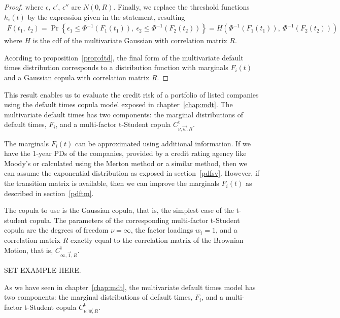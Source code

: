 \documentclass[11pt,fleqn]{book} %
\begin{document}
\begin{proof}
	where $\epsilon$, $\epsilon'$, $\epsilon''$ are $N(0,R)$. 
	Finally, we replace the threshold functions $h_i(t)$ by the expression 
	given in the statement, resulting
	\begin{displaymath}
		\begin{array}{l}
			F(t_1,\ t_2) = 
			\Pr\left\{ \epsilon_1 \le \Phi^{-1}(F_1(t_1)),\ \epsilon_2 \le \Phi^{-1}(F_2(t_2)) \right\} = 
			H\left( \Phi^{-1}(F_1(t_1)),\ \Phi^{-1}(F_2(t_2)) \right)
		\end{array}
	\end{displaymath}
	where $H$ is the cdf of the multivariate Gaussian with correlation matrix $R$.
	
	Acording to proposition~\ref{prop:dtd}, the final form of the multivariate
	default times distribution corresponds to a distribution function with 
	marginals $F_i(t)$ and a Gaussian copula with correlation matrix $R$.
	
\end{proof}

This result enables us to evaluate the credit risk of a portfolio of listed 
companies using the default times copula model exposed in chapter~\ref{chap:mdt}.
The multivariate default times has two components: the marginal distributions 
of default times, $F_i$, and a multi-factor t-Student copula 
$C_{\nu,\vec{w},R}^{\text{t}}$.

The marginals $F_i(t)$ can be approximated using additional information. If we 
have the 1-year PDs of the companies, provided by a credit rating agency like 
Moody's or calculated using the Merton method or a similar method, then we can 
assume the exponential distribution as exposed in section~\ref{pdfsv}. However, 
if the transition matrix is available, then we can improve the marginals 
$F_i(t)$ as described in section~\ref{pdftm}.

The copula to use is the Gaussian copula, that is, the simplest case of the 
t-student copula. The parameters of the corresponding multi-factor t-Student 
copula are the degrees of freedom $\nu=\infty$, the factor loadings $w_i=1$, 
and a correlation matrix $R$ exactly equal to the correlation matrix of the 
Brownian Motion, that is, $C_{\infty,\vec{1},R}^{\text{t}}$.

\begin{example}
	SET EXAMPLE HERE.
\end{example}



As we have seen in chapter~\ref{chap:mdt}, the multivariate default times model 
has two components: the marginal distributions of default times, $F_i$, and a 
multi-factor t-Student copula $C_{\nu,\vec{w},R}^{\text{t}}$.
\end{document}
